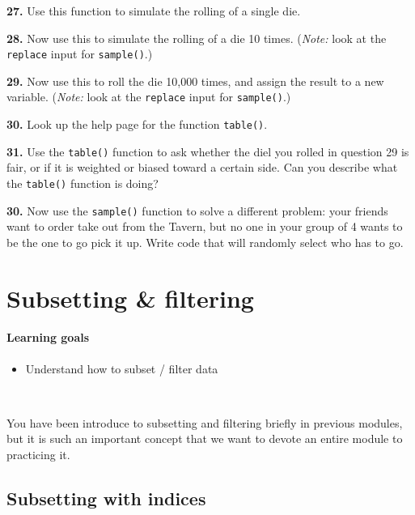 \documentclass[]{book}
\providecommand{\tightlist}{%
  \setlength{\itemsep}{0pt}\setlength{\parskip}{0pt}}
\begin{document}
\textbf{27.} Use this function to simulate the rolling of a single die.

\textbf{28.} Now use this to simulate the rolling of a die 10 times. (\emph{Note:} look at the \texttt{replace} input for \texttt{sample()}.)

\textbf{29.} Now use this to roll the die 10,000 times, and assign the result to a new variable. (\emph{Note:} look at the \texttt{replace} input for \texttt{sample()}.)

\textbf{30.} Look up the help page for the function \texttt{table()}.

\textbf{31.} Use the \texttt{table()} function to ask whether the diel you rolled in question 29 is fair, or if it is weighted or biased toward a certain side. Can you describe what the \texttt{table()} function is doing?

\textbf{30.} Now use the \texttt{sample()} function to solve a different problem: your friends want to order take out from the Tavern, but no one in your group of 4 wants to be the one to go pick it up. Write code that will randomly select who has to go.

\hypertarget{subsetting-filtering}{%
\chapter{Subsetting \& filtering}\label{subsetting-filtering}}

\hypertarget{learning-goals-5}{%
\subsubsection*{Learning goals}\label{learning-goals-5}}

\begin{itemize}
\tightlist
\item
  Understand how to subset / filter data
\end{itemize}

~

You have been introduce to subsetting and filtering briefly in previous modules, but it is such an important concept that we want to devote an entire module to practicing it.

\hypertarget{subsetting-with-indices}{%
\section*{Subsetting with indices}\label{subsetting-with-indices}}
\end{document}
